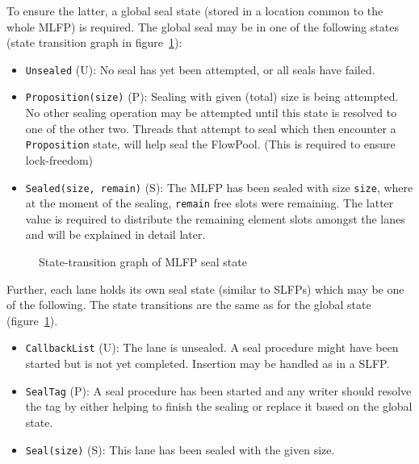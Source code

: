 \documentclass[runningheads,a4paper,fleqn]{llncs}
\begin{document}
To ensure the latter, a global seal state (stored in a location common
to the whole MLFP) is required. The global seal may be in one of the
following states (state transition graph in
figure~\ref{fig:seal-states}):
\begin{itemize}
\item \verb+Unsealed+ (U): No seal has yet been attempted, or all
  seals have failed.
\item \verb+Proposition(size)+ (P): Sealing with given (total) size is
  being attempted. No other sealing operation may be attempted until
  this state is resolved to one of the other two. Threads that attempt
  to seal which then encounter a \verb+Proposition+ state, will help seal
  the FlowPool. (This is required to ensure lock-freedom)
\item \verb+Sealed(size, remain)+ (S): The MLFP has been sealed with
  size \verb+size+, where at the moment of the sealing, \verb+remain+
  free slots were remaining. The latter value is required to
  distribute the remaining element slots amongst the lanes and will be
  explained in detail later.
\end{itemize}

\begin{figure}
  \centering
  \caption{State-transition graph of MLFP seal state}
  \label{fig:seal-states}
\end{figure}

Further, each lane holds its own seal state (similar to SLFPs) which
may be one of the following. The state transitions are the same as for
the global state (figure~\ref{fig:seal-states}).
\begin{itemize}
\item \verb+CallbackList+ (U): The lane is unsealed. A seal procedure
  might have been started but is not yet completed. Insertion may be
  handled as in a SLFP.
\item \verb+SealTag+ (P): A seal procedure has been started and any
  writer should resolve the tag by either helping to finish the
  sealing or replace it based on the global state.
\item \verb+Seal(size)+ (S): This lane has been sealed with the given 
  size.
\end{itemize}
\end{document}
